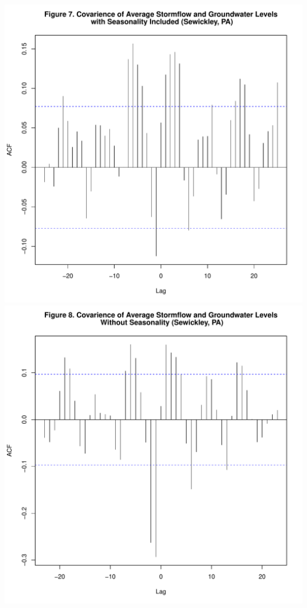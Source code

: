 \documentclass[
  12pt,
]{article}
\begin{document}
\includegraphics{Elliott_WDA_Project_files/figure-latex/groundwater_lag-5.pdf}
\includegraphics{Elliott_WDA_Project_files/figure-latex/groundwater_lag-6.pdf}
\newpage
\end{document}
